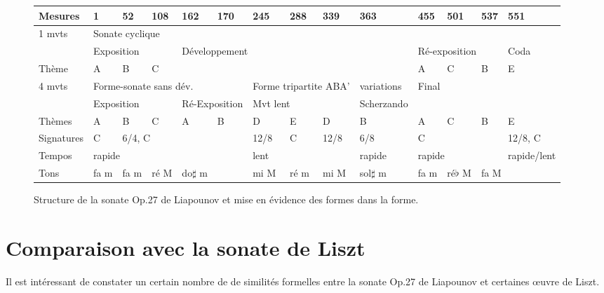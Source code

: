 \begin{figure}[!p]
  \begin{bigcenter}
    \vspace{-1cm}
     {
\begin{tabular}{|l|l|l|l|l|l|l|l|l|l|l|l|l|l|}
 \hline
   Mesures & 1 & 52 & 108 & 162 & 170 & 245 & 288 & 339 & 363 & 455 & 501 & 537 & 551 \\
 \hline
 \hline
   1 mvts & \multicolumn{13}{|l|}{Sonate cyclique}\\
 \hline
          & \multicolumn{3}{|l|}{Exposition} & \multicolumn{6}{l|}{Développement} & \multicolumn{3}{l|}{Ré-exposition} & Coda\\
 \hline
   Thème & A & B & C & \multicolumn{6}{l|}{} & A & C & B & E\\
 \hline
 \hline
   4 mvts & \multicolumn{5}{|l|}{Forme-sonate sans dév.} & \multicolumn{3}{|l|}{Forme tripartite ABA'} & variations & \multicolumn{4}{|l|}{Final}\\
 \hline
          & \multicolumn{3}{|l|}{Exposition} & \multicolumn{2}{l|}{Ré-Exposition} & \multicolumn{3}{l|}{Mvt lent} & Scherzando & \multicolumn{4}{l|}{}\\
 \hline
  Thèmes & A & B & C & A & B & D & E & D & B & A & C & B & E\\
 \hline
 \hline
  Signatures & C & \multicolumn{4}{|l|}{6/4, C} & 12/8 & C & 12/8 & 6/8 & \multicolumn{3}{|l|}{C} & 12/8, C\\
 \hline
  Tempos & \multicolumn{5}{|l|}{rapide} & \multicolumn{3}{|l|}{lent} & rapide & \multicolumn{3}{|l|}{rapide} & rapide/lent\\
 \hline
  Tons & fa m & fa m & ré M & \multicolumn{2}{|l|}{do$\sharp$ m} & mi M & ré m & mi M & sol$\sharp$ m & fa m & ré$\flat$ M & \multicolumn{2}{|l|}{fa M}\\
 \hline
\end{tabular}
    }
  \end{bigcenter}
  \caption{\label{structure}Structure de la sonate Op.27 de Liapounov et mise en évidence des formes dans la forme.}
\end{figure}

\section{Comparaison avec la sonate de Liszt}

Il est intéressant de constater un certain nombre de de similités formelles entre la sonate Op.27 de Liapounov et certaines œuvre de Liszt.

